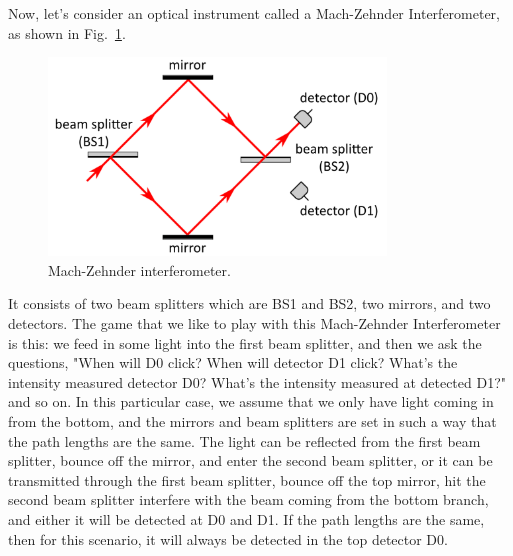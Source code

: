 Now, let's consider an optical instrument called a Mach-Zehnder Interferometer, as shown in Fig.~\ref{fig:mach-zehnder}.
\begin{figure}[H]
   \centering
    \includegraphics[width=0.8\textwidth]{lesson6/mach_zehnder.pdf}
    
        \caption{Mach-Zehnder interferometer.}
    \label{fig:mach-zehnder}
    
\end{figure}
It consists of two beam splitters which are BS1 and BS2, two mirrors, and two detectors.  The game that we like to play with this Mach-Zehnder Interferometer is this: we feed in some light into the first beam splitter, and then we ask the questions, "When will D0 click?  When will detector D1 click? What's the intensity measured detector D0? What's the intensity measured at detected D1?" and so on. In this particular case, we assume that we only have light coming in from the bottom, and the mirrors and beam splitters are set in such a way that the path lengths are the same. The light can be reflected from the first beam splitter, bounce off the mirror, and enter the second beam splitter, or it can be transmitted through the first beam splitter, bounce off the top mirror, hit the second beam splitter interfere with the beam coming from the bottom branch, and either it will be detected at D0 and D1. If the path lengths are the same, then for this scenario, it will always be detected in the top detector D0.

